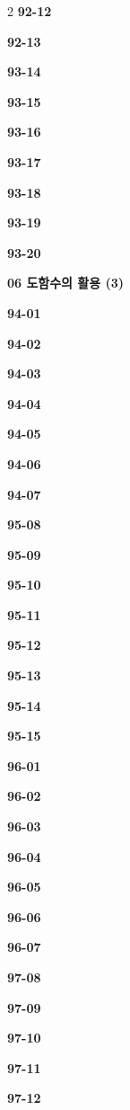 \documentclass[10pt,a4paper]{article}
\begin{document}
\begin{multicols}{2}
\noindent\textbf{92-12}\ \par
\noindent\textbf{92-13}\ \par
\noindent\textbf{93-14}\ \par
\noindent\textbf{93-15}\ \par
\noindent\textbf{93-16}\ \par
\noindent\textbf{93-17}\ \par
\noindent\textbf{93-18}\ \par
\noindent\textbf{93-19}\ \par
\noindent\textbf{93-20}\ \par
\noindent\textbf{06 도함수의 활용 (3)}\par\smallskip
\noindent\textbf{94-01}\ \par
\noindent\textbf{94-02}\ \par
\noindent\textbf{94-03}\ \par
\noindent\textbf{94-04}\ \par
\noindent\textbf{94-05}\ \par
\noindent\textbf{94-06}\ \par
\noindent\textbf{94-07}\ \par
\noindent\textbf{95-08}\ \par
\noindent\textbf{95-09}\ \par
\noindent\textbf{95-10}\ \par
\noindent\textbf{95-11}\ \par
\noindent\textbf{95-12}\ \par
\noindent\textbf{95-13}\ \par
\noindent\textbf{95-14}\ \par
\noindent\textbf{95-15}\ \par
\noindent\textbf{96-01}\ \par
\noindent\textbf{96-02}\ \par
\noindent\textbf{96-03}\ \par
\noindent\textbf{96-04}\ \par
\noindent\textbf{96-05}\ \par
\noindent\textbf{96-06}\ \par
\noindent\textbf{96-07}\ \par
\noindent\textbf{97-08}\ \par
\noindent\textbf{97-09}\ \par
\noindent\textbf{97-10}\ \par
\noindent\textbf{97-11}\ \par
\noindent\textbf{97-12}\ \par

\end{multicols}
\end{document}
